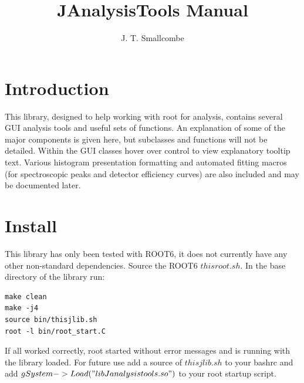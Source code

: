 \documentclass[a4paper,10pt]{article}
\title{JAnalysisTools Manual}
\author{J. T. Smallcombe}
\begin{document}
\maketitle
\tableofcontents

\section{Introduction}
This library, designed to help working with root for analysis, contains several GUI analysis tools and useful sets of functions. An explanation of some of the major components is given here, but subclasses and functions will not be detailed.
Within the GUI classes hover over control to view explanatory tooltip text.
Various histogram presentation formatting and automated fitting macros (for spectroscopic peaks and detector efficiency curves) are also included and may be documented later. 

\section{Install}
This library has only been tested with ROOT6, it does not currently have any other non-standard dependencies.
Source the ROOT6 $thisroot.sh$.
In the base directory of the library run:
\lstset{language=bash}
\begin{lstlisting}
make clean
make -j4
source bin/thisjlib.sh
root -l bin/root_start.C
\end{lstlisting}
If all worked correctly, root started without error messages and is running with the library loaded.
For future use add a source of $thisjlib.sh$ to your bashrc and add $gSystem->Load("libJanalysistools.so")$ to your root startup script.
\end{document}
